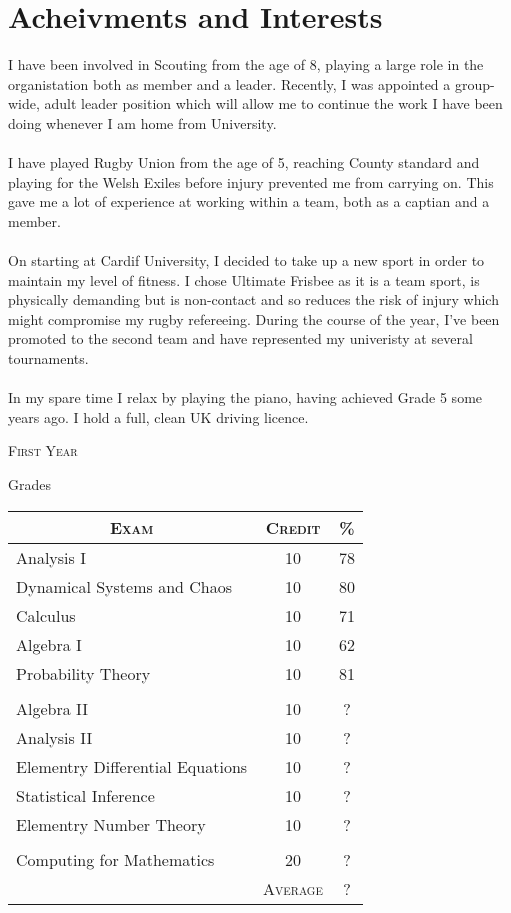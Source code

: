 \documentclass[a4paper]{article}
\begin{document}
\section{Acheivments and Interests}
I have been involved in Scouting from the age of 8, playing a large role in the organistation both as member and a leader. Recently, I was appointed a group-wide, adult leader position which will allow me to continue the work I have been doing whenever I am home from University. \\
\\
I have played Rugby Union from the age of 5, reaching County standard and playing for the Welsh Exiles before injury prevented me from carrying on. This gave me a lot of experience at working within a team, both as a captian and a member. \\
\\
On starting at Cardif University, I decided to take up a new sport in order to maintain my level of fitness. I chose Ultimate Frisbee as it is a team sport, is physically demanding but is non-contact and so reduces the risk of injury which might compromise my rugby refereeing. During the course of the year, I've been promoted to the second team and have represented my univeristy at several tournaments. \\
\\
In my spare time I relax by playing the piano, having achieved Grade 5 some years ago. I hold a full, clean UK driving licence.
\bigskip
\par{\centering\Large {\textsc{First Year}}
\par}\large{\centering Grades\par}\normalsize

\begin{center}
\begin{tabular}{lcc}

\multicolumn{1}{c}{\textsc{Exam}} & \textsc{Credit}&\textsc{\%}\\ \hline
Analysis I & 10 & 78\\
Dynamical Systems and Chaos & 10 & 80\\
Calculus & 10 & 71\\
Algebra I & 10 & 62\\
Probability Theory & 10 & 81\\
\\
Algebra II & 10 & ?\\
Analysis II & 10 & ?\\
Elementry Differential Equations & 10 & ?\\
Statistical Inference & 10 & ?\\
Elementry Number Theory & 10 & ?\\
\\
Computing for Mathematics & 20 & ?\\
\cline{2-3}
&\textsc{Average}&?

\end{tabular}
\end{center}
\bigskip
\end{document}

